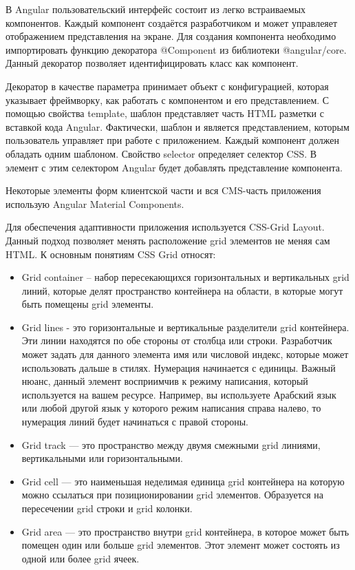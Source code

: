 В Angular пользовательский интерфейс состоит из легко встраиваемых компонентов.
Каждый компонент создаётся разработчиком и может управлеяет отображением представления на экране.
Для создания компонента необходимо импортировать функцию декоратора @Component из библиотеки @angular/core.
Данный декоратор позволяет идентифицировать класс как компонент.

Декоратор в качестве параметра принимает объект с конфигурацией, которая указывает фреймворку, как работать с компонентом и его представлением.
С помощью свойства template, шаблон представляет часть HTML разметки с вставкой кода Angular.
Фактически, шаблон и является представлением, которым пользователь управляет при работе с приложением.
Каждый компонент должен обладать одним шаблоном.
Свойство selector определяет селектор CSS. В элемент с этим селектором Angular будет добавлять представление компонента.

Некоторые элементы форм клиентской части и вся CMS-часть приложения использую Angular Material Components.

Для обеспечения адаптивности приложения используется CSS-Grid Layout.
Данный подход позволяет менять расположение grid элементов не меняя сам HTML. К основным понятиям CSS Grid относят:
\begin{itemize}
    \item Grid container – набор пересекающихся горизонтальных и вертикальных grid линий, которые делят пространство контейнера на области, в которые могут быть помещены grid элементы.
    \item Grid lines - это горизонтальные и вертикальные разделители grid контейнера.
    Эти линии находятся по обе стороны от столбца или строки.
    Разработчик может задать для данного элемента имя или числовой индекс, которые может использовать дальше в стилях.
    Нумерация начинается с единицы.
    Важный нюанс, данный элемент восприимчив к режиму написания, который используется на вашем ресурсе.
    Например, вы используете Арабский язык или любой другой язык у которого режим написания справа налево, то нумерация линий будет начинаться с правой стороны.
    \item Grid track — это пространство между двумя смежными grid линиями, вертикальными или горизонтальными.
    \item Grid cell — это наименьшая неделимая единица grid контейнера на которую можно ссылаться при позиционировании grid элементов.
    Образуется на пересечении grid строки и grid колонки.
    \item Grid area — это пространство внутри grid контейнера, в которое может быть помещен один или больше grid элементов.
    Этот элемент может состоять из одной или более grid ячеек.
\end{itemize}

